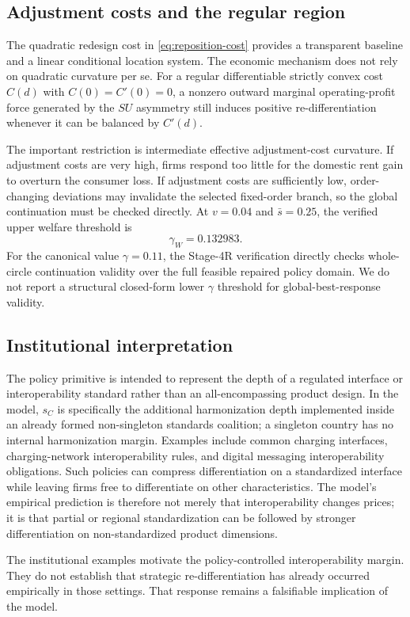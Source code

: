 \subsection{Adjustment costs and the regular region}

The quadratic redesign cost in \eqref{eq:reposition-cost} provides a transparent baseline and a linear conditional location system. The economic mechanism does not rely on quadratic curvature per se. For a regular differentiable strictly convex cost $C(d)$ with $C(0)=C'(0)=0$, a nonzero outward marginal operating-profit force generated by the $SU$ asymmetry still induces positive re-differentiation whenever it can be balanced by $C'(d)$.

The important restriction is intermediate effective adjustment-cost curvature. If adjustment costs are very high, firms respond too little for the domestic rent gain to overturn the consumer loss. If adjustment costs are sufficiently low, order-changing deviations may invalidate the selected fixed-order branch, so the global continuation must be checked directly. At $v=0.04$ and $\bar s=0.25$, the verified upper welfare threshold is
\[
\gamma_W=0.132983.
\]
For the canonical value $\gamma=0.11$, the Stage-4R verification directly checks whole-circle continuation validity over the full feasible repaired policy domain. We do not report a structural closed-form lower $\gamma$ threshold for global-best-response validity.

\subsection{Institutional interpretation}

The policy primitive is intended to represent the depth of a regulated interface or interoperability standard rather than an all-encompassing product design. In the model, $s_C$ is specifically the additional harmonization depth implemented inside an already formed non-singleton standards coalition; a singleton country has no internal harmonization margin. Examples include common charging interfaces, charging-network interoperability rules, and digital messaging interoperability obligations. Such policies can compress differentiation on a standardized interface while leaving firms free to differentiate on other characteristics. The model's empirical prediction is therefore not merely that interoperability changes prices; it is that partial or regional standardization can be followed by stronger differentiation on non-standardized product dimensions.

The institutional examples motivate the policy-controlled interoperability margin. They do not establish that strategic re-differentiation has already occurred empirically in those settings. That response remains a falsifiable implication of the model.